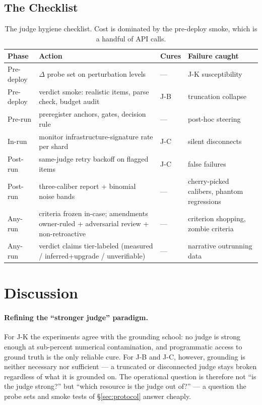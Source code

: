 \documentclass[11pt]{article}
\begin{document}
\subsection{The Checklist}
\begin{table}[h]
\centering\small
\begin{tabular}{@{}p{}p{}p{}p{}@{}}
\toprule
Phase & Action & Cures & Failure caught \\
\midrule
Pre-deploy & $\Delta$ probe set on perturbation levels & --- & J-K susceptibility \\
Pre-deploy & verdict smoke: realistic items, parse check, budget audit & J-B & truncation collapse \\
Pre-run & preregister anchors, gates, decision rule & --- & post-hoc steering \\
In-run & monitor infrastructure-signature rate per shard & J-C & silent disconnects \\
Post-run & same-judge retry backoff on flagged items & J-C & false failures \\
Post-run & three-caliber report + binomial noise bands & --- & cherry-picked calibers, phantom regressions \\
Any-run & criteria frozen in-case; amendments owner-ruled + adversarial review + non-retroactive & --- & criterion shopping, zombie criteria \\
Any-run & verdict claims tier-labeled (measured / inferred+upgrade / unverifiable) & --- & narrative outrunning data \\
\bottomrule
\end{tabular}
\caption{The judge hygiene checklist. Cost is dominated by the pre-deploy
smoke, which is a handful of API calls.}
\label{tab:checklist}
\end{table}

\section{Discussion}
\label{sec:discussion}

\paragraph{Refining the ``stronger judge'' paradigm.}
For J-K the experiments agree with the grounding school: no judge is strong
enough at sub-percent numerical contamination, and programmatic access to
ground truth is the only reliable cure. For J-B and J-C, however, grounding
is neither necessary nor sufficient --- a truncated or disconnected judge
stays broken regardless of what it is grounded on. The operational question
is therefore not ``is the judge strong?'' but ``which resource is the judge
out of?'' --- a question the probe sets and smoke tests of \S\ref{sec:protocol}
answer cheaply.
\end{document}
